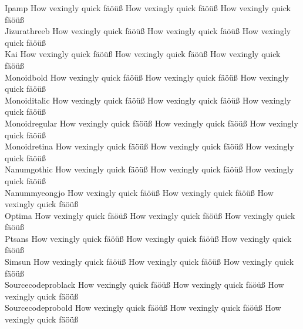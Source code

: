 \begin{tabbing}
Ipamp \> {\mktsStyleNormal{}How vexingly quick fäöüß} {\mktsFontfileIpamp{}How vexingly quick fäöüß} {\mktsStyleItalic{}How vexingly quick fäöüß} \\
Jizurathreeb \> {\mktsStyleNormal{}How vexingly quick fäöüß} {\mktsFontfileJizurathreeb{}How vexingly quick fäöüß} {\mktsStyleItalic{}How vexingly quick fäöüß} \\
Kai \> {\mktsStyleNormal{}How vexingly quick fäöüß} {\mktsFontfileKai{}How vexingly quick fäöüß} {\mktsStyleItalic{}How vexingly quick fäöüß} \\
Monoidbold \> {\mktsStyleNormal{}How vexingly quick fäöüß} {\mktsFontfileMonoidbold{}How vexingly quick fäöüß} {\mktsStyleItalic{}How vexingly quick fäöüß} \\
Monoiditalic \> {\mktsStyleNormal{}How vexingly quick fäöüß} {\mktsFontfileMonoiditalic{}How vexingly quick fäöüß} {\mktsStyleItalic{}How vexingly quick fäöüß} \\
Monoidregular \> {\mktsStyleNormal{}How vexingly quick fäöüß} {\mktsFontfileMonoidregular{}How vexingly quick fäöüß} {\mktsStyleItalic{}How vexingly quick fäöüß} \\
Monoidretina \> {\mktsStyleNormal{}How vexingly quick fäöüß} {\mktsFontfileMonoidretina{}How vexingly quick fäöüß} {\mktsStyleItalic{}How vexingly quick fäöüß} \\
Nanumgothic \> {\mktsStyleNormal{}How vexingly quick fäöüß} {\mktsFontfileNanumgothic{}How vexingly quick fäöüß} {\mktsStyleItalic{}How vexingly quick fäöüß} \\
Nanummyeongjo \> {\mktsStyleNormal{}How vexingly quick fäöüß} {\mktsFontfileNanummyeongjo{}How vexingly quick fäöüß} {\mktsStyleItalic{}How vexingly quick fäöüß} \\
Optima \> {\mktsStyleNormal{}How vexingly quick fäöüß} {\mktsFontfileOptima{}How vexingly quick fäöüß} {\mktsStyleItalic{}How vexingly quick fäöüß} \\
Ptsans \> {\mktsStyleNormal{}How vexingly quick fäöüß} {\mktsFontfilePtsans{}How vexingly quick fäöüß} {\mktsStyleItalic{}How vexingly quick fäöüß} \\
Simsun \> {\mktsStyleNormal{}How vexingly quick fäöüß} {\mktsFontfileSimsun{}How vexingly quick fäöüß} {\mktsStyleItalic{}How vexingly quick fäöüß} \\
Sourcecodeproblack \> {\mktsStyleNormal{}How vexingly quick fäöüß} {\mktsFontfileSourcecodeproblack{}How vexingly quick fäöüß} {\mktsStyleItalic{}How vexingly quick fäöüß} \\
Sourcecodeprobold \> {\mktsStyleNormal{}How vexingly quick fäöüß} {\mktsFontfileSourcecodeprobold{}How vexingly quick fäöüß} {\mktsStyleItalic{}How vexingly quick fäöüß} \\

\end{tabbing}
